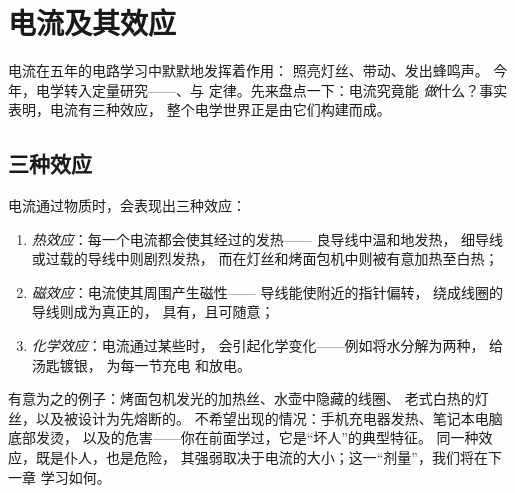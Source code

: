 \chapter{电流及其效应}\label{ch:g8:electric-current-effects}

电流在五年的电路学习中默默地发挥着作用：
照亮灯丝、带动、发出蜂鸣声。
今年，电学转入定量研究——、与
定律。先来盘点一下：电流究竟能
\emph{做}什么？事实表明，电流有三种效应，
整个电学世界正是由它们构建而成。

\section{三种效应}

\begin{proposition}[电流的效应]\label{prop:g8:electric-current-effects:three}
电流通过物质时，会表现出三种效应：
\begin{enumerate}
  \item \emph{热效应}：每一个电流都会使其经过的发热——
        良导线中温和地发热，
        细导线或过载的导线中则剧烈发热，
        而在灯丝和烤面包机中则被有意加热至白热；
  \item \emph{磁效应}：电流使其周围产生磁性——
        导线能使附近的指针偏转，
        绕成线圈的导线则成为真正的，
        具有，且可随意；
  \item \emph{化学效应}：电流通过某些时，
        会引起化学变化——例如将水分解为两种，
        给汤匙镀银，
        为每一节充电
        和放电。
\end{enumerate}
\end{proposition}

\begin{example}[热效应的应用]\label{ex:g8:electric-current-effects:heating}
有意为之的例子：烤面包机发光的加热丝、水壶中隐藏的线圈、
老式白热的灯丝，以及被设计为先熔断的。
不希望出现的情况：手机充电器发热、笔记本电脑底部发烫，
以及的危害——你在前面学过，它是“坏人”的典型特征。
同一种效应，既是仆人，也是危险，
其强弱取决于电流的大小；这一“剂量”，我们将在下一章
学习如何\emph{}。
\end{example}

